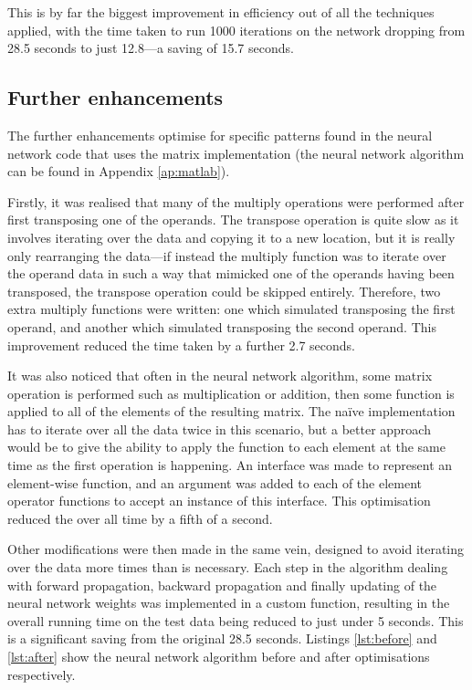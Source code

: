 This is by far the biggest improvement in efficiency out of all the techniques applied, with the time taken to run 1000 iterations on the network dropping from 28.5 seconds to just 12.8---a saving of 15.7 seconds.

\subsection{Further enhancements}

The further enhancements optimise for specific patterns found in the neural network code that uses the matrix implementation (the neural network algorithm can be found in Appendix \ref{ap:matlab}).

Firstly, it was realised that many of the multiply operations were performed after first transposing one of the operands.  The transpose operation is quite slow as it involves iterating over the data and copying it to a new location, but it is really only rearranging the data---if instead the multiply function was to iterate over the operand data in such a way that mimicked one of the operands having been transposed, the transpose operation could be skipped entirely.  Therefore, two extra multiply functions were written: one which simulated transposing the first operand, and another which simulated transposing the second operand.  This improvement reduced the time taken by a further 2.7 seconds.

It was also noticed that often in the neural network algorithm, some matrix operation is performed such as multiplication or addition, then some function is applied to all of the elements of the resulting matrix.  The na\"{i}ve implementation has to iterate over all the data twice in this scenario, but a better approach would be to give the ability to apply the function to each element at the same time as the first operation is happening.  An interface was made to represent an element-wise function, and an argument was added to each of the element operator functions to accept an instance of this interface.  This optimisation reduced the over all time by a fifth of a second.

Other modifications were then made in the same vein, designed to avoid iterating over the data more times than is necessary.  Each step in the algorithm dealing with forward propagation, backward propagation and finally updating of the neural network weights was implemented in a custom function, resulting in the overall running time on the test data being reduced to just under 5 seconds.  This is a significant saving from the original 28.5 seconds.  Listings \ref{lst:before} and \ref{lst:after} show the neural network algorithm before and after optimisations respectively.

